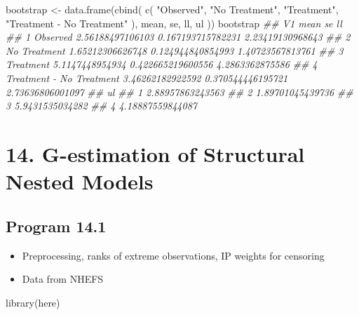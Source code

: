 \documentclass[
  10pt,
  a4paper,
]{book}
\newenvironment{Shaded}{\begin{snugshade}}{\end{snugshade}}
\newcommand{\DocumentationTok}[1]{\textcolor[rgb]{0.37,0.37,0.37}{\textit{#1}}}
\newcommand{\FunctionTok}[1]{\textcolor[rgb]{0.28,0.35,0.67}{#1}}
\newcommand{\NormalTok}[1]{\textcolor[rgb]{0.00,0.46,0.62}{#1}}
\newcommand{\OtherTok}[1]{\textcolor[rgb]{0.00,0.46,0.62}{#1}}
\newcommand{\StringTok}[1]{\textcolor[rgb]{0.13,0.47,0.30}{#1}}
\providecommand{\tightlist}{%
  \setlength{\itemsep}{0pt}\setlength{\parskip}{0pt}}
\begin{document}
\begin{Shaded}
\begin{Highlighting}[]
\NormalTok{bootstrap }\OtherTok{\textless{}{-}}
  \FunctionTok{data.frame}\NormalTok{(}\FunctionTok{cbind}\NormalTok{(}
    \FunctionTok{c}\NormalTok{(}
      \StringTok{"Observed"}\NormalTok{,}
      \StringTok{"No Treatment"}\NormalTok{,}
      \StringTok{"Treatment"}\NormalTok{,}
      \StringTok{"Treatment {-} No Treatment"}
\NormalTok{    ),}
\NormalTok{    mean,}
\NormalTok{    se,}
\NormalTok{    ll,}
\NormalTok{    ul}
\NormalTok{  ))}
\NormalTok{bootstrap}
\DocumentationTok{\#\#                         V1             mean                se               ll}
\DocumentationTok{\#\# 1                 Observed 2.56188497106103 0.167193715782231 2.23419130968643}
\DocumentationTok{\#\# 2             No Treatment 1.65212306626748 0.124944840854993 1.40723567813761}
\DocumentationTok{\#\# 3                Treatment  5.1147448954934 0.422665219600556  4.2863362875586}
\DocumentationTok{\#\# 4 Treatment {-} No Treatment 3.46262182922592 0.370544446195721 2.73636806001097}
\DocumentationTok{\#\#                 ul}
\DocumentationTok{\#\# 1 2.88957863243563}
\DocumentationTok{\#\# 2 1.89701045439736}
\DocumentationTok{\#\# 3  5.9431535034282}
\DocumentationTok{\#\# 4 4.18887559844087}
\end{Highlighting}
\end{Shaded}

\hypertarget{g-estimation-of-structural-nested-models}{%
\chapter*{14. G-estimation of Structural Nested Models}\label{g-estimation-of-structural-nested-models}}

\hypertarget{program-14.1}{%
\section{Program 14.1}\label{program-14.1}}

\begin{itemize}
\tightlist
\item
  Preprocessing, ranks of extreme observations, IP weights for censoring
\item
  Data from NHEFS
\end{itemize}

\begin{Shaded}
\begin{Highlighting}[]
\FunctionTok{library}\NormalTok{(here)}
\end{Highlighting}
\end{Shaded}
\end{document}
